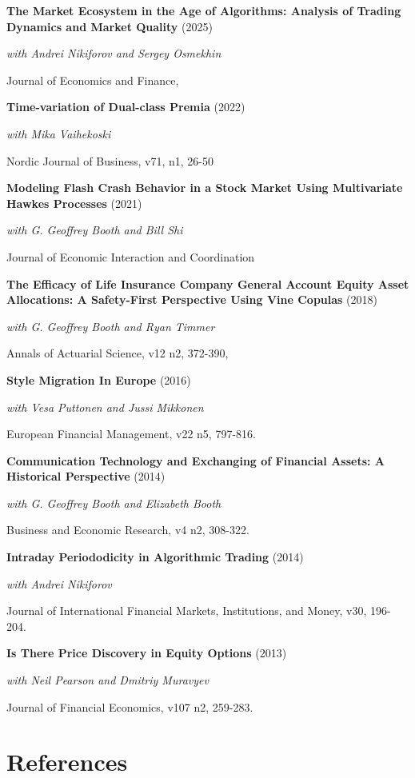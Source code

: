 \documentclass[11pt,a4paper,]{awesome-cv}
\begin{document}
\textbf{The Market Ecosystem in the Age of Algorithms: Analysis of Trading Dynamics and Market Quality}
(2025)

\textit{with Andrei Nikiforov and Sergey Osmekhin}

Journal of Economics and Finance,

\textbf{Time-variation of Dual-class Premia} (2022)

\textit{with Mika Vaihekoski}

Nordic Journal of Business, v71, n1, 26-50

\textbf{Modeling Flash Crash Behavior in a Stock Market Using Multivariate Hawkes Processes}
(2021)

\textit{with G. Geoffrey Booth and Bill Shi}

Journal of Economic Interaction and Coordination

\textbf{The Efficacy of Life Insurance Company General Account Equity Asset Allocations: A Safety-First Perspective Using Vine Copulas}
(2018)

\textit{with G. Geoffrey Booth and Ryan Timmer}

Annals of Actuarial Science, v12 n2, 372-390,

\textbf{Style Migration In Europe} (2016)

\textit{with Vesa Puttonen and Jussi Mikkonen}

European Financial Management, v22 n5, 797-816.

\textbf{Communication Technology and Exchanging of Financial Assets: A Historical Perspective}
(2014)

\textit{with G. Geoffrey Booth and Elizabeth Booth}

Business and Economic Research, v4 n2, 308-322.

\textbf{Intraday Periododicity in Algorithmic Trading} (2014)

\textit{with Andrei Nikiforov}

Journal of International Financial Markets, Institutions, and Money,
v30, 196-204.

\textbf{Is There Price Discovery in Equity Options} (2013)

\textit{with Neil Pearson and Dmitriy Muravyev}

Journal of Financial Economics, v107 n2, 259-283.

\section{References}\label{references}
\end{document}
